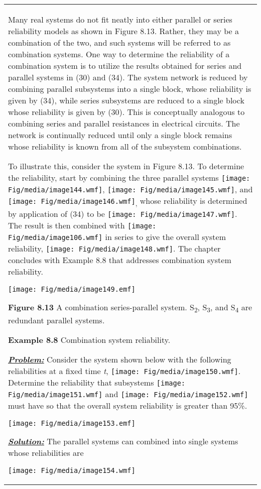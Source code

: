 \begin{table}
\begin{tabular}{m{15cm}|}
Many real systems do not fit neatly into either parallel or series
reliability models as shown in Figure 8.13. Rather, they may be a
combination of the two, and such systems will be referred to as
combination systems. One way to determine the reliability of a
combination system is to utilize the results obtained for series and
parallel systems in (30) and (34). The system network is reduced by
combining parallel subsystems into a single block, whose reliability is
given by (34), while series subsystems are reduced to a single block
whose reliability is given by (30). This is conceptually analogous to
combining series and parallel resistances in electrical circuits. The
network is continually reduced until only a single block remains whose
reliability is known from all of the subsystem combinations.

To illustrate this, consider the system in Figure 8.13. To determine the
reliability, start by combining the three parallel systems
\texttt{[image: Fig/media/image144.wmf]},
\texttt{[image: Fig/media/image145.wmf]}, and
\texttt{[image: Fig/media/image146.wmf]}\textsubscript{,} whose
reliability is determined by application of (34) to be
\texttt{[image: Fig/media/image147.wmf]}. The result is then combined
with \texttt{[image: Fig/media/image106.wmf]} in series to give the
overall system reliability, \texttt{[image: Fig/media/image148.wmf]}.
The chapter concludes with Example 8.8 that addresses combination system
reliability.

\texttt{[image: Fig/media/image149.emf]}

\textbf{Figure 8.13} A combination series-parallel system.
S\textsubscript{2}, S\textsubscript{3}, and S\textsubscript{4} are
redundant parallel systems.

\textbf{Example 8.8} Combination system reliability.

\emph{\textbf{\ul{Problem:}}} Consider the system shown below with the
following reliabilities at a fixed time \emph{t},
\texttt{[image: Fig/media/image150.wmf]}. Determine the reliability that
subsystems \texttt{[image: Fig/media/image151.wmf]} and
\texttt{[image: Fig/media/image152.wmf]} must have so that the overall
system reliability is greater than 95\%.

\texttt{[image: Fig/media/image153.emf]}

\emph{\textbf{\ul{Solution:}}} The parallel systems can combined into
single systems whose reliabilities are

\texttt{[image: Fig/media/image154.wmf]}


\end{tabular}
\end{table}
